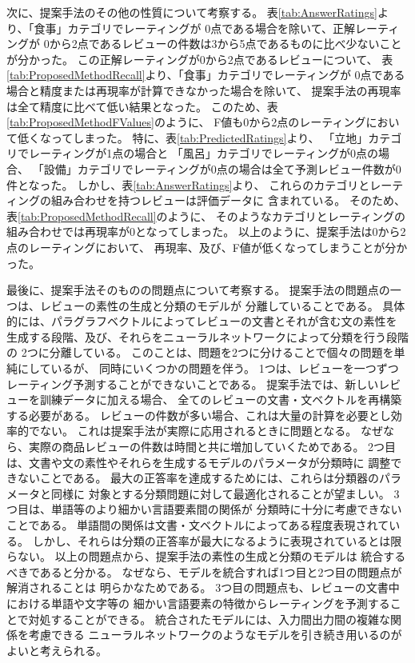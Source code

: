 次に、提案手法のその他の性質について考察する。
%
表\ref{tab:AnswerRatings}より、「食事」カテゴリでレーティングが
0点である場合を除いて、正解レーティングが
0から2点であるレビューの件数は3から5点であるものに比べ少ないことが分かった。
この正解レーティングが0から2点であるレビューについて、
表\ref{tab:ProposedMethodRecall}より、「食事」カテゴリでレーティングが
0点である場合と精度または再現率が計算できなかった場合を除いて、
提案手法の再現率は全て精度に比べて低い結果となった。
このため、表\ref{tab:ProposedMethodFValues}のように、
F値も0から2点のレーティングにおいて低くなってしまった。
%
特に、表\ref{tab:PredictedRatings}より、
「立地」カテゴリでレーティングが1点の場合と
「風呂」カテゴリでレーティングが0点の場合、
「設備」カテゴリでレーティングが0点の場合は全て予測レビュー件数が0件となった。
しかし、表\ref{tab:AnswerRatings}より、
これらのカテゴリとレーティングの組み合わせを持つレビューは評価データに
含まれている。
そのため、表\ref{tab:ProposedMethodRecall}のように、
そのようなカテゴリとレーティングの組み合わせでは再現率が0となってしまった。
%
以上のように、提案手法は0から2点のレーティングにおいて、
再現率、及び、F値が低くなってしまうことが分かった。

最後に、提案手法そのものの問題点について考察する。
提案手法の問題点の一つは、レビューの素性の生成と分類のモデルが
分離していることである。
具体的には、パラグラフベクトルによってレビューの文書とそれが含む文の素性を
生成する段階、及び、それらをニューラルネットワークによって分類を行う段階の
2つに分離している。
このことは、問題を2つに分けることで個々の問題を単純にしているが、
同時にいくつかの問題を伴う。
1つは、レビューを一つずつレーティング予測することができないことである。
提案手法では、新しいレビューを訓練データに加える場合、
全てのレビューの文書・文ベクトルを再構築する必要がある。
レビューの件数が多い場合、これは大量の計算を必要とし効率的でない。
これは提案手法が実際に応用されるときに問題となる。
なぜなら、実際の商品レビューの件数は時間と共に増加していくためである。
2つ目は、文書や文の素性やそれらを生成するモデルのパラメータが分類時に
調整できないことである。
最大の正答率を達成するためには、これらは分類器のパラメータと同様に
対象とする分類問題に対して最適化されることが望ましい。
3つ目は、単語等のより細かい言語要素間の関係が
分類時に十分に考慮できないことである。
単語間の関係は文書・文ベクトルによってある程度表現されている。
しかし、それらは分類の正答率が最大になるように表現されているとは限らない。
以上の問題点から、提案手法の素性の生成と分類のモデルは
統合するべきであると分かる。
なぜなら、モデルを統合すれば1つ目と2つ目の問題点が解消されることは
明らかなためである。
3つ目の問題点も、レビューの文書中における単語や文字等の
細かい言語要素の特徴からレーティングを予測することで対処することができる。
統合されたモデルには、入力間出力間の複雑な関係を考慮できる
ニューラルネットワークのようなモデルを引き続き用いるのがよいと考えられる。
